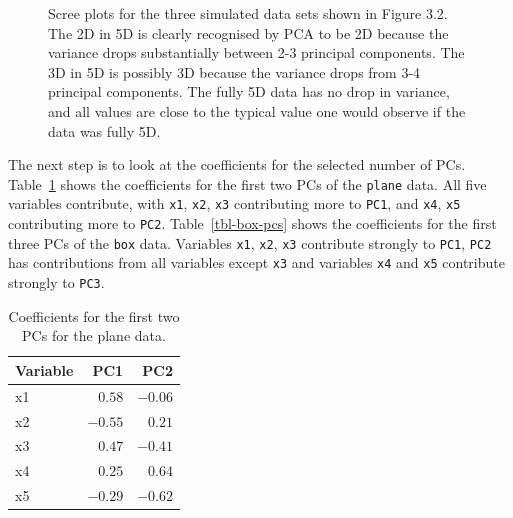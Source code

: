 \documentclass[
  letterpaper,
]{krantz}
\begin{document}

\begin{figure}


\caption{\label{fig-2D-pca}Scree plots for the three simulated data sets
shown in Figure 3.2. The 2D in 5D is clearly recognised by PCA to be 2D
because the variance drops substantially between 2-3 principal
components. The 3D in 5D is possibly 3D because the variance drops from
3-4 principal components. The fully 5D data has no drop in variance, and
all values are close to the typical value one would observe if the data
was fully 5D.}

\end{figure}%

The next step is to look at the coefficients for the selected number of
PCs. Table~\ref{tbl-plane-pcs} shows the coefficients for the first two
PCs of the \texttt{plane} data. All five variables contribute, with
\texttt{x1}, \texttt{x2}, \texttt{x3} contributing more to \texttt{PC1},
and \texttt{x4}, \texttt{x5} contributing more to \texttt{PC2}.
Table~\ref{tbl-box-pcs} shows the coefficients for the first three PCs
of the \texttt{box} data. Variables \texttt{x1}, \texttt{x2},
\texttt{x3} contribute strongly to \texttt{PC1}, \texttt{PC2} has
contributions from all variables except \texttt{x3} and variables
\texttt{x4} and \texttt{x5} contribute strongly to \texttt{PC3}.


\begin{longtable}{lrr}

\caption{\label{tbl-plane-pcs}Coefficients for the first two PCs for the
plane data.}

\tabularnewline

\toprule
Variable & PC1 & PC2 \\ 
\midrule\addlinespace[2.5pt]
x1 & $0.58$ & $-0.06$ \\ 
x2 & $-0.55$ & $0.21$ \\ 
x3 & $0.47$ & $-0.41$ \\ 
x4 & $0.25$ & $0.64$ \\ 
x5 & $-0.29$ & $-0.62$ \\ 
\bottomrule

\end{longtable}
\end{document}
